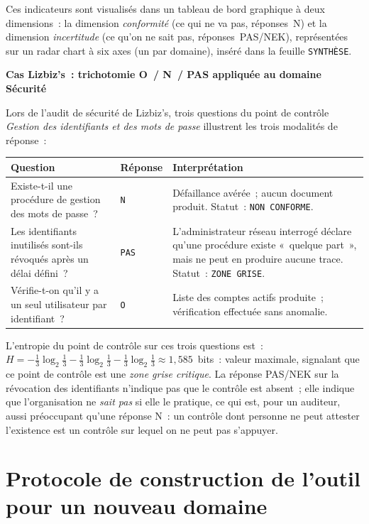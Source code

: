 Ces indicateurs sont visualisés dans un tableau de bord graphique à deux
dimensions~: la dimension \emph{conformité} (ce qui ne va pas, réponses~N)
et la dimension \emph{incertitude} (ce qu'on ne sait pas, réponses~PAS/NEK),
représentées sur un radar chart à six axes (un par domaine), inséré dans la
feuille \texttt{SYNTHÈSE}.

\begin{boxlizbiz}
\textbf{Cas Lizbiz's~: trichotomie O~/ N~/ PAS appliquée au domaine Sécurité}

Lors de l'audit de sécurité de Lizbiz's, trois questions du point de contrôle
\emph{Gestion des identifiants et des mots de passe} illustrent les trois
modalités de réponse~:

\smallskip
\begin{tabular}{p{6.5cm}p{1.2cm}p{5cm}}
\textbf{Question} & \textbf{Réponse} & \textbf{Interprétation} \\
\midrule
Existe-t-il une procédure de gestion des mots de passe~? &
\texttt{N} &
Défaillance avérée~; aucun document produit. Statut~: \texttt{NON~CONFORME}. \\
\addlinespace
Les identifiants inutilisés sont-ils révoqués après un délai défini~? &
\texttt{PAS} &
L'administrateur réseau interrogé déclare qu'une procédure existe «~quelque
part~», mais ne peut en produire aucune trace. Statut~: \texttt{ZONE~GRISE}. \\
\addlinespace
Vérifie-t-on qu'il y a un seul utilisateur par identifiant~? &
\texttt{O} &
Liste des comptes actifs produite~; vérification effectuée sans anomalie. \\
\end{tabular}

\smallskip
L'entropie du point de contrôle sur ces trois questions est~:
$H = -\frac{1}{3}\log_2\frac{1}{3} - \frac{1}{3}\log_2\frac{1}{3}
        - \frac{1}{3}\log_2\frac{1}{3} \approx 1{,}585$~bits~: valeur maximale,
signalant que ce point de contrôle est une \emph{zone grise critique}. La
réponse PAS/NEK sur la révocation des identifiants n'indique pas que le
contrôle est absent~; elle indique que l'organisation ne \emph{sait pas} si
elle le pratique, ce qui est, pour un auditeur, aussi préoccupant qu'une
réponse N~: un contrôle dont personne ne peut attester l'existence est un
contrôle sur lequel on ne peut pas s'appuyer.
\end{boxlizbiz}

\section{Protocole de construction de l'outil pour un nouveau domaine}
\label{sec:protocole}

